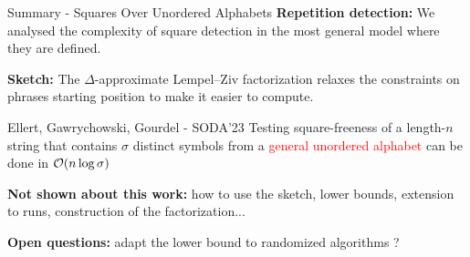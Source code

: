 \begin{frame}{Summary - Squares Over Unordered Alphabets}
    \textbf{Repetition detection:} We analysed the complexity of square detection in the most general model where they are defined.
    \vfill
    
    \textbf{Sketch:} The $\Delta$-approximate Lempel--Ziv factorization relaxes the constraints on phrases starting position to make it easier to compute.
    \vfill
    \begin{myalertblock}{Ellert, Gawrychowski, Gourdel - SODA'23}
        Testing square-freeness of a length-$n$ string  that contains $\sigma$ distinct symbols from a \textcolor{red}{general unordered alphabet} can be done in $\mathcal{O}(n \log \sigma)$
    \end{myalertblock}
    \vfill
    \textbf{Not shown about this work:} how to use the sketch, lower bounds, extension to runs, construction of the factorization...

    \smallskip
    \textbf{Open questions:} adapt the lower bound to randomized algorithms ?
\end{frame}
    